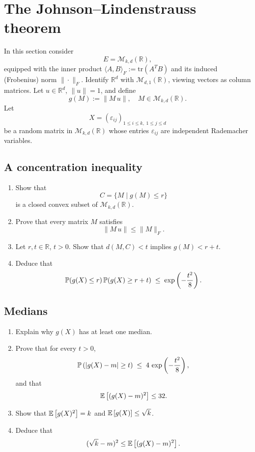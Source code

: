 \documentclass[a4paper]{report}
\begin{document}
\bigskip

\section{The Johnson--Lindenstrauss theorem}\label{sec:3}
In this section consider
\[
  E = \mathcal{M}_{k,d}(\mathbb{R}),
\]
equipped with the inner product
\(\langle A, B\rangle_F := \mathrm{tr}(A^T B)\)
and its induced (Frobenius) norm \(\|\cdot\|_F\). Identify \(\mathbb R^d\) with \(\mathcal M_{d,1}(\mathbb R)\), viewing vectors as column matrices. Let \(u\in\mathbb R^d\), \(\|u\|=1\), and define
\[
  g(M) := \|M\,u\|,
  \quad
  M\in\mathcal{M}_{k,d}(\mathbb{R}).
\]
Let
\[
  X = (\varepsilon_{ij})_{1\le i\le k,\;1\le j\le d}
\]
be a random matrix in \(\mathcal M_{k,d}(\mathbb R)\) whose entries \(\varepsilon_{ij}\) are independent Rademacher variables.

\subsection{A concentration inequality}
\begin{enumerate}
\item Show that
  \[
    C = \{M \mid g(M)\le r\}
  \]
is a closed convex subset of \(\mathcal M_{k,d}(\mathbb R)\).
\item Prove that every matrix \(M\) satisfies
  \[
    \|M\,u\| \le \|M\|_F.
  \]
\item Let \(r,t\in\mathbb R\), \(t>0\). Show that \(d(M,C)<t\) implies \(g(M)<r+t\).
\item Deduce that
  \[
    \mathbb{P}(g(X)\le r)\,\mathbb{P}(g(X)\ge r+t)
    \;\le\;
    \exp\left ( -\frac{t^2}{8} \right ).
  \]
\end{enumerate}

\subsection{Medians}
\begin{enumerate}
\item Explain why \(g(X)\) has at least one median.
\item Prove that for every \(t>0\),
  \[
    \mathbb{P}\left ( |g(X)-m|\ge t \right )
    \;\le\;
    4\,\exp\left ( -\frac{t^2}{8} \right ),
  \]
and that
  \[
    \mathbb {E}\left[ (g(X)-m)^2\right] \le 32.
  \]
\item Show that \(\mathbb {E}\left[ g(X)^2\right]=k\) and \(\mathbb {E}\left[ g(X)\right]\leq\sqrt k\).
\item Deduce that
  \[
    (\sqrt{k}-m)^2 \le \mathbb {E}\left[ (g(X)-m)^2\right].
  \]
\end{enumerate}
\end{document}
